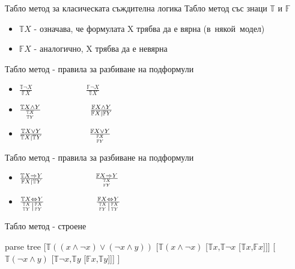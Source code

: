 \documentclass[14pt, aspectratio=169]{beamer}
\newcommand\ST{\mathbb{T}}
\newcommand\SF{\mathbb{F}}
\begin{document}
\begin{frame}{Табло метод за класическата съждителна логика}
	Табло метод със знаци $\ST$ и $\SF$
	\begin{itemize}
		\item $\ST X$ - означава, че формулата X трябва да е вярна (в~някой~модел)
		\item $\SF X$ - аналогично, X трябва да е невярна
	\end{itemize}
\end{frame}

\begin{frame}{Табло метод - правила за разбиване на подформули}
	\begin{itemize}
	\LARGE
		\item<1-> $\frac{\ST \neg X}{\SF X}\;\;\;\;\;\;\;\;\;\;\;\;\;\;\;\;\;\;\;\;\;\;\ \frac{\SF \neg X}{\ST X}$
		\\ [8mm]
		\item<2-> $\frac{\ST X \land Y}{{\ST X \atop \ST Y}} \;\;\;\;\;\;\;\;\;\;\;\;\;\;\;\;\;\;\;\;\; \frac{\SF X \land Y}{\SF X \mid \SF Y}$
		\\ [8mm]
		\item<3-> $\frac{\ST X \lor Y}{\ST X \mid \ST Y} \;\;\;\;\;\;\;\;\;\;\;\;\;\;\;\;\;\;\;\ \frac{\SF X \lor Y}{{\SF X \atop \SF Y}}$
	\normalsize
	\end{itemize}
\end{frame}

\begin{frame}{Табло метод - правила за разбиване на подформули}
	\begin{itemize}
	\LARGE
		\item<1-> $\frac{\ST X \Rightarrow Y}{\SF X \mid \ST Y} \;\;\;\;\;\;\;\;\;\;\;\;\;\;\;\;\;\;\;\;\;\ \frac{\SF X \Rightarrow Y}{{\ST X \atop \SF Y}}$
		\\ [8mm]
		\item<2-> $\frac{\ST X \Leftrightarrow Y}{\left.{\ST X \atop \ST Y}\right\vert{\SF X \atop \SF Y}} \;\;\;\;\;\;\;\;\;\;\;\;\;\;\;\;\;\;\;\;\;\ \frac{\SF X \Leftrightarrow Y}{\left.{\ST X \atop \SF Y}\right\vert{\SF X \atop \ST Y}}$
	\normalsize
	\end{itemize}
\end{frame}

\begin{frame}{Табло метод - строене}
	\begin{center}
	\begin{forest}
		parse tree
		[$\ST ((x \land \neg x) \lor (\neg x \land y))$
			[$\ST (x \land \neg x)$ [$\ST x \mbox{,} \ST \neg x$ [$\ST x \mbox{,} \SF x$]]]
			[$\ST (\neg x \land y)$ [$\ST \neg  x \mbox{,} \ST y$ [$\SF x \mbox{,} \ST y$]]]
		]
	\end{forest}
	\end{center}
\end{frame}
\end{document}
